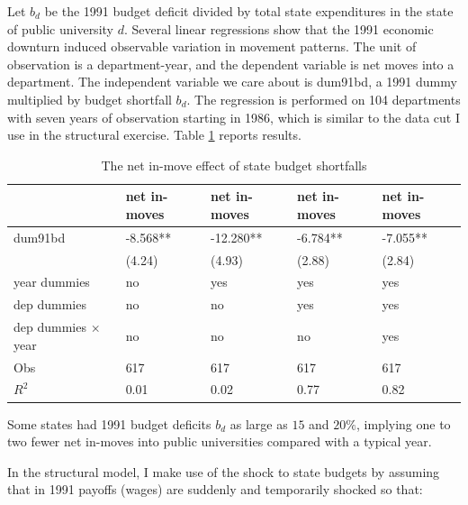 Let $b_d$ be the 1991 budget deficit
divided by total state expenditures in the state of public university
$d$.   Several linear regressions show that the 1991 economic downturn induced observable variation
in movement patterns.  The unit of observation is a department-year, and the dependent variable
 is net moves into a department.  The independent variable we care about is dum91bd, a 1991
dummy multiplied by budget shortfall $b_d$. The regression is performed
on 104 departments with seven years of observation starting in 1986, which
is similar to the data cut I use in the structural exercise.
 Table \ref{tab:bd_reg} reports results.

\begin{table}[h]
    \centering
    \begin{tabular}{lllll}
        \hline
                            & net in-moves &   net in-moves &     net in-moves &    net in-moves \\   \hline \hline
dum91bd                     &     -8.568** &     -12.280**  &      -6.784**    &      -7.055**   \\
                            &      (4.24)  &      (4.93)    &      (2.88)      &      (2.84)     \\
year dummies                &        no    &         yes    &          yes     &         yes     \\
dep dummies                 &        no    &         no     &          yes     &         yes     \\
dep dummies $\times$ year   & no           &  no            &   no             &  yes            \\  \hline
Obs                         & 617          &  617           &   617            &  617            \\
$R^2$                       & 0.01         &  0.02          &   0.77           &  0.82           \\  \hline
    \end{tabular}
    \caption{The net in-move effect of state budget shortfalls}
    \label{tab:bd_reg}
\end{table}

Some states had 1991 budget deficits $b_d$ as large as $15$ and $20\%$, implying
one to two fewer net in-moves into public universities compared with a typical year.

In the structural model, I make use of the shock to state budgets by assuming that in 1991 payoffs
 (wages) are suddenly and temporarily shocked so that:

